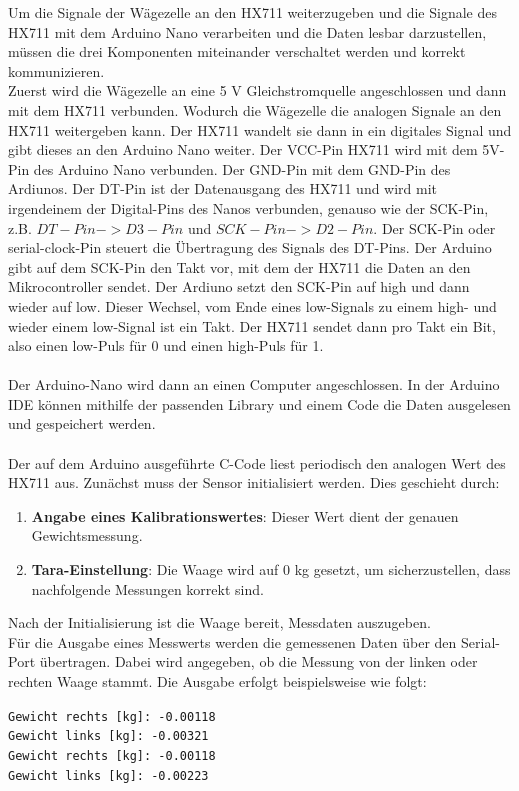 Um die Signale der Wägezelle an den HX711 weiterzugeben und die Signale des HX711 mit dem Arduino Nano verarbeiten und die Daten lesbar darzustellen, müssen die drei Komponenten miteinander verschaltet werden und korrekt kommunizieren. \\
Zuerst wird die Wägezelle an eine 5 V Gleichstromquelle angeschlossen und dann mit dem HX711 verbunden. Wodurch die Wägezelle die analogen Signale an den HX711 weitergeben kann. Der HX711 wandelt sie dann in ein digitales Signal und gibt dieses an den Arduino Nano weiter. Der VCC-Pin HX711 wird mit dem 5V-Pin des Arduino Nano verbunden. Der GND-Pin mit dem GND-Pin des Ardiunos. Der DT-Pin ist der Datenausgang des HX711 und wird mit irgendeinem der Digital-Pins des Nanos verbunden, genauso wie der SCK-Pin, z.B. $DT-Pin -> D3-Pin$ und $SCK-Pin -> D2-Pin$. Der SCK-Pin oder serial-clock-Pin steuert die Übertragung des Signals des DT-Pins. Der Arduino gibt auf dem SCK-Pin den Takt vor, mit dem der HX711 die Daten an den Mikrocontroller sendet. Der Ardiuno setzt den SCK-Pin auf high und dann wieder auf low. Dieser Wechsel, vom Ende eines low-Signals zu einem high- und wieder einem low-Signal ist ein Takt. Der HX711 sendet dann pro Takt ein Bit, also einen low-Puls für 0 und einen high-Puls für 1. \\
\\
Der Arduino-Nano wird dann an einen Computer angeschlossen.
In der Arduino IDE können mithilfe der passenden Library und einem Code die Daten ausgelesen und gespeichert werden.
\\
\\
Der auf dem Arduino ausgeführte C-Code liest periodisch den analogen Wert des HX711 aus. Zunächst muss der Sensor initialisiert werden. Dies geschieht durch:
\begin{enumerate}
    \item \textbf{Angabe eines Kalibrationswertes}: Dieser Wert dient der genauen Gewichtsmessung.
    \item \textbf{Tara-Einstellung}: Die Waage wird auf 0 kg gesetzt, um sicherzustellen, dass nachfolgende Messungen korrekt sind.
\end{enumerate}
Nach der Initialisierung ist die Waage bereit, Messdaten auszugeben.
\\
Für die Ausgabe eines Messwerts werden die gemessenen Daten über den Serial-Port übertragen.
Dabei wird angegeben, ob die Messung von der linken oder rechten Waage stammt.
Die Ausgabe erfolgt beispielsweise wie folgt:
\begin{center}
    \texttt{Gewicht rechts [kg]: -0.00118}  \\
    \texttt{Gewicht links [kg]: -0.00321} \\
    \texttt{Gewicht rechts [kg]: -0.00118} \\
    \texttt{Gewicht links [kg]: -0.00223} \\
\end{center}

